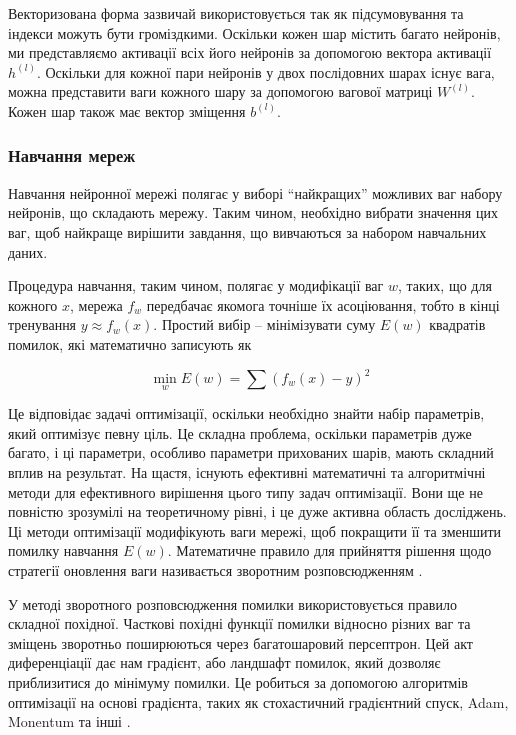 \documentclass[a4paper,14pt]{extreport}
\begin{document}
Векторизована форма зазвичай використовується так як підсумовування
та індекси можуть бути громіздкими. Оскільки кожен шар містить
багато нейронів, ми представляємо активації всіх його нейронів
за допомогою вектора активації $h^{(l)}$. Оскільки для кожної пари
нейронів у двох послідовних шарах існує вага, можна представити
ваги кожного шару за допомогою вагової матриці $W^{(l)}$. Кожен шар також має вектор зміщення $b^{(l)}$.

\subsubsection{Навчання мереж}
Навчання нейронної мережі полягає у виборі ``найкращих'' можливих
ваг набору нейронів, що складають мережу. Таким чином,
необхідно вибрати значення цих ваг, щоб найкраще вирішити
завдання, що вивчаються за набором навчальних даних.

Процедура навчання, таким чином, полягає у модифікації ваг $w$,
таких, що для кожного $x$, мережа $f_w$ передбачає якомога
точніше їх асоціювання, тобто в кінці тренування $y \approx f_w(x)$.
Простий вибір -- мінімізувати суму $E(w)$ квадратів
помилок, які математично записують як

\begin{equation}
    \min_w E(w) = \sum (f_w(x) - y)^2
\end{equation}

Це відповідає задачі оптимізації, оскільки необхідно знайти
набір параметрів, який оптимізує певну ціль.
Це складна проблема, оскільки параметрів дуже багато, і ці
параметри, особливо параметри прихованих шарів, мають складний
вплив на результат. На щастя, існують ефективні математичні та
алгоритмічні методи для ефективного вирішення цього типу задач
оптимізації. Вони ще не повністю зрозумілі на теоретичному
рівні, і це дуже активна область досліджень. Ці методи
оптимізації модифікують ваги мережі, щоб покращити її та
зменшити помилку навчання $E(w)$. Математичне
правило для прийняття рішення щодо стратегії оновлення
ваги називається зворотним розповсюдженням \cite{nn:backpropagation}.

У методі зворотного розповсюдження помилки
використовується правило складної похідної.
Часткові похідні функції помилки відносно різних ваг та зміщень
зворотньо поширюються через багатошаровий персептрон.
Цей акт диференціації дає нам градієнт, або ландшафт помилок,
який дозволяє приблизитися до мінімуму помилки. Це робиться
за допомогою алгоритмів оптимізації на основі градієнта, таких
як стохастичний градієнтний спуск, Adam, Monentum та інші
\cite{gradient-descend}.
\end{document}
